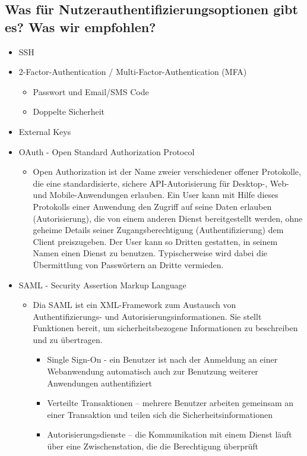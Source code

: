 \subsection*{Was für Nutzerauthentifizierungsoptionen gibt es? Was wir empfohlen?}
\begin{itemize}
    \item SSH
    \item 2-Factor-Authentication / Multi-Factor-Authentication (MFA)
    \begin{itemize}
        \item Passwort und Email/SMS Code
        \item Doppelte Sicherheit
    \end{itemize}
    \item External Keys
    \item OAuth - Open Standard Authorization Protocol
    \begin{itemize}
        \item Open Authorization ist der Name zweier verschiedener offener Protokolle, die eine standardisierte, sichere API-Autorisierung für Desktop-, Web- und Mobile-Anwendungen erlauben. Ein User kann mit Hilfe dieses Protokolls einer Anwendung den Zugriff auf seine Daten erlauben (Autorisierung), die von einem anderen Dienst bereitgestellt werden, ohne geheime Details seiner Zugangsberechtigung (Authentifizierung) dem Client preiszugeben. Der User kann so Dritten gestatten, in seinem Namen einen Dienst zu benutzen. Typischerweise wird dabei die Übermittlung von Passwörtern an Dritte vermieden.\cite{wiki}
    \end{itemize}
    \item SAML - Security Assertion Markup Language
    \begin{itemize}
        \item Dia SAML ist ein XML-Framework zum Austausch von Authentifizierungs- und Autorisierungsinformationen. Sie stellt Funktionen bereit, um sicherheitsbezogene Informationen zu beschreiben und zu übertragen.
        \begin{itemize}
            \item Single Sign-On - ein Benutzer ist nach der Anmeldung an einer Webanwendung automatisch auch zur Benutzung weiterer Anwendungen authentifiziert
            \item Verteilte Transaktionen – mehrere Benutzer arbeiten gemeinsam an einer Transaktion und teilen sich die Sicherheitsinformationen
            \item Autorisierungsdienste – die Kommunikation mit einem Dienst läuft über eine Zwischenstation, die die Berechtigung überprüft
        \end{itemize}
    \end{itemize}
\end{itemize}

